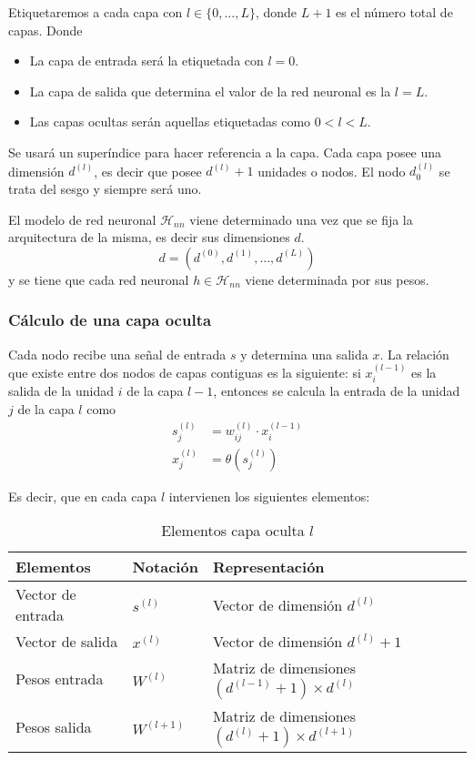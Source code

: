 Etiquetaremos a cada capa con $l \in \{0, \ldots, L \}$, donde $L+1$ es el número total de capas.  Donde 

\begin{itemize}
    \item La capa de entrada será la etiquetada con $l = 0$.
    \item La capa de salida que determina el valor de la red neuronal es la $l=L$.
    \item Las capas ocultas serán aquellas etiquetadas como $0 < l <L.$
\end{itemize}

Se usará un superíndice para hacer referencia a la capa. 
Cada capa posee una dimensión $d^{(l)}$, es decir que posee
$d^{(l)} + 1$ unidades o nodos. El nodo $d_0^{(l)}$ se trata del sesgo y siempre será uno. 

El modelo de red neuronal $\mathcal{H}_{n n}$ viene determinado una vez que se fija la arquitectura de la misma, es decir sus dimensiones $d$. 
\begin{equation}
    d = (d^{(0)}, d^{(1)}, \ldots, d^{(L)})
\end{equation}
y se tiene que cada red neuronal $h \in \mathcal{H}_{n n}$
viene determinada por sus pesos. 

\subsubsection*{Cálculo de una capa oculta}  
Cada nodo recibe una señal de entrada $s$ y determina una salida $x$. 
La relación que existe entre dos nodos de capas contiguas es la siguiente: si $x_i^{(l-1)}$ es la salida de la unidad $i$ de la capa $l-1$, 
entonces se calcula la entrada de la unidad $j$ de la capa $l$ como 
\begin{align}\label{eq:construcción_red_neuronas:calculo_una_capa_oculta}
    s_j^{(l)} &= w_{i j}^{(l)} \cdot x_i^{(l-1)}  \\
    x_j^{(l)} &= \theta(s_j^{(l)})
\end{align}

Es decir, que en cada capa $l$ intervienen los siguientes elementos:  
\begin{table}[h]
    \begin{center}
    \begin{tabular}{| l | l | l |}
    \hline
    Elementos & Notación & Representación 
    \\ \hline
    Vector de entrada & $s^{(l)}$ &  Vector de dimensión $d^{(l)}$ \\
    Vector de salida & $x^{(l)}$ &  Vector de dimensión $d^{(l)}+ 1$ \\
    Pesos entrada & $W^{(l)}$ & Matriz de dimensiones $(d^{(l-1)}+1) \times d^{(l)}$ \\
    Pesos salida & $W^{(l+1)}$ 
    & Matriz de dimensiones $(d^{(l)}+1) \times d^{(l+1)}$ \\
    \hline
    \end{tabular}
    \caption{Elementos capa oculta $l$}
    \label{tab:rrnn_elementos_capa_oculta}
    \end{center}
\end{table}

